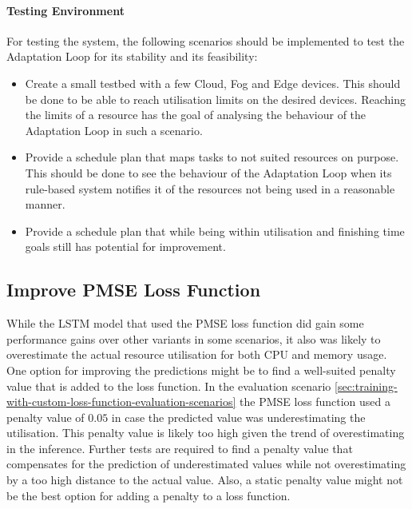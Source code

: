             \paragraph{Testing Environment}
            For testing the system, the following scenarios should be implemented to test the Adaptation Loop for its stability and its feasibility:
            \begin{itemize}
                \item Create a small testbed with a few Cloud, Fog and Edge devices. This should be done to be able to reach utilisation limits on the desired devices. Reaching the limits of a resource has the goal of analysing the behaviour of the Adaptation Loop in such a scenario.
                \item Provide a schedule plan that maps tasks to not suited resources on purpose. This should be done to see the behaviour of the Adaptation Loop when its rule-based system notifies it of the resources not being used in a reasonable manner.
                \item Provide a schedule plan that while being within utilisation and finishing time goals still has potential for improvement.
            \end{itemize}

        \subsection{Improve PMSE Loss Function}
        \label{sec:improve-pmse-loss-function-future-work}

            While the LSTM model that used the PMSE loss function did gain some performance gains over other variants in some scenarios, it also was likely to overestimate the actual resource utilisation for both CPU and memory usage.
            One option for improving the predictions might be to find a well-suited penalty value that is added to the loss function.
            In the evaluation scenario \ref{sec:training-with-custom-loss-function-evaluation-scenarios} the PMSE loss function used a penalty value of $0.05$ in case the predicted value was underestimating the utilisation. 
            This penalty value is likely too high given the trend of overestimating in the inference. Further tests are required to find a penalty value that compensates for the prediction of underestimated values while not overestimating by a too high distance to the actual value.
            Also, a static penalty value might not be the best option for adding a penalty to a loss function.

